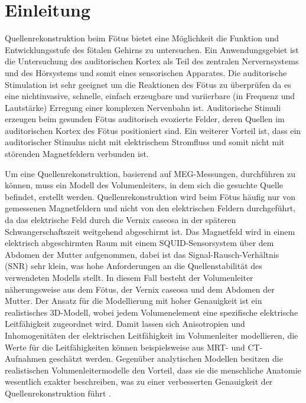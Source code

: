 \chapter{Einleitung}
Quellenrekonstruktion beim Fötus bietet eine Möglichkeit die Funktion
und Entwicklungsstufe des fötalen Gehirns zu untersuchen. Ein
Anwendungsgebiet ist die Untersuchung des auditorischen Kortex als Teil
des zentralen Nervernsystems und des Hörsystems und somit eines
sensorischen Apparates. Die auditorische Stimulation ist sehr geeignet
um die Reaktionen des Fötus zu überprüfen da es eine nichtinvasive,
schnelle, einfach erzeugbare und variierbare (in Frequenz und
Lautstärke) Erregung einer komplexen Nervenbahn ist. Auditorische
Stimuli erzeugen beim gesunden Fötus auditorisch evozierte Felder,
deren Quellen im auditorischen Kortex des Fötus positioniert sind. Ein
weiterer Vorteil ist, dass ein auditorischer Stimulus nicht mit
elektrischem Stromfluss und somit nicht mit störenden Magnetfeldern
verbunden ist.

Um eine Quellenrekonstruktion, basierend auf MEG-Messungen, durchführen
zu können, muss ein Modell des Volumenleiters, in dem sich die gesuchte
Quelle befindet, erstellt werden. Quellenrekonstruktion wird beim Fötus
häufig nur von gemessenen Magnetfeldern und nicht von den elektrischen
Feldern durchgeführt, da das elektrische Feld durch die Vernix caseosa
in der späteren Schwangerschaftszeit weitgehend abgeschirmt ist. Das
Magnetfeld wird in einem elektrisch abgeschirmten Raum mit einem
SQUID-Sensorsystem über dem Abdomen der Mutter aufgenommen, dabei ist
das Signal-Rausch-Verhältnis (SNR) sehr klein, was hohe Anforderungen
an die Quellenstabilität des verwendeten Modells stellt. In diesem Fall
besteht der Volumenleiter näherungsweise aus dem Fötus, der Vernix
caseosa und dem Abdomen der Mutter. Der Ansatz für die Modellierung mit
hoher Genauigkeit ist ein realistisches 3D-Modell, wobei jedem
Volumenelement eine spezifische elektrische Leitfähigkeit zugeordnet
wird. Damit lassen sich Anisotropien und Inhomogenitäten der
elektrischen Leitfähigkeit im Volumenleiter modellieren, die Werte für
die Leitfähigkeiten können beispielsweise aus MRT- und CT-Aufnahmen
geschätzt werden. Gegenüber analytischen Modellen besitzen die
realistischen Volumenleitermodelle den Vorteil, dass sie die
menschliche Anatomie wesentlich exakter beschreiben, was zu einer
verbesserten Genauigkeit der Quellenrekonstruktion führt \cite{a2}.

